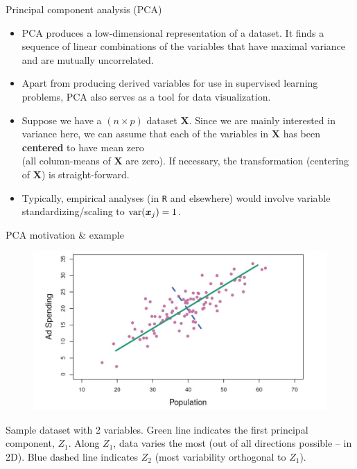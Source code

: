 \documentclass{beamer}
\begin{document}
\begin{frame}{Principal component analysis (PCA)}
\begin{itemize}
\item PCA produces a low-dimensional representation of a dataset. It finds a sequence of linear combinations of the variables that have maximal variance and are mutually uncorrelated.
\medskip
\item Apart from producing derived variables for use in supervised learning problems, PCA also serves as a tool for data visualization.
\medskip
\item Suppose we have a $(n \! \times \! p)$ dataset $\bm{X}$. Since we are mainly interested in variance here, we can assume that each of the variables in $\bm{X}$ has been \textbf{centered} to have mean zero \\(all column-means of $\bm{X}$ are zero). If necessary, the transformation (centering of $\bm{X}$) is straight-forward.
\medskip
\item Typically, empirical analyses (in \texttt{R} and elsewhere) would involve variable standardizing/scaling to $\textnormal{var}(\bm{x}_j)=1$.
\end{itemize}
\end{frame}
\begin{frame}{PCA motivation \& example}
\vspace{-0.3cm}
\begin{figure}
\includegraphics[scale=0.30]{IMG/PCAexample.jpg}
\end{figure}
\vspace{-0.3cm}
\centering Sample dataset with 2 variables. Green line indicates the first principal component, $Z_1$. Along $Z_1$, data varies the most (out of all directions possible -- in 2D). Blue dashed line indicates $Z_2$ (most variability orthogonal to $Z_1$).
\end{frame}
\end{document}
